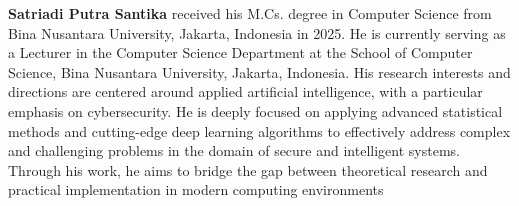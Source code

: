 \documentclass[12pt,a4paper]{article}
\begin{document}
\textbf{Satriadi Putra Santika} received his M.Cs. degree in Computer Science from Bina Nusantara University, Jakarta, Indonesia in 2025. He is currently serving as a Lecturer in the Computer Science Department at the School of Computer Science, Bina Nusantara University, Jakarta, Indonesia. His research interests and directions are centered around applied artificial intelligence, with a particular emphasis on cybersecurity. He is deeply focused on applying advanced statistical methods and cutting-edge deep learning algorithms to effectively address complex and challenging problems in the domain of secure and intelligent systems. Through his work, he aims to bridge the gap between theoretical research and practical implementation in modern computing environments
\end{document}

